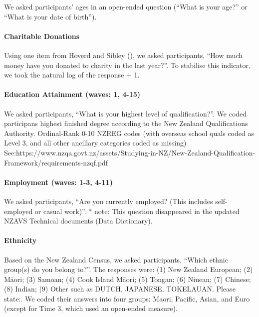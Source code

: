 \documentclass[
  singlecolumn]{article}
\let\oldparagraph\paragraph
\renewcommand{\paragraph}[1]{\oldparagraph{#1}\mbox{}}
\begin{document}
We asked participants' ages in an open-ended question (``What is your
age?'' or ``What is your date of birth'').

\paragraph{Charitable Donations}\label{charitable-donations}

Using one item from Hoverd and Sibley
(), we asked participants,
``How much money have you donated to charity in the last year?''. To
stabilise this indicator, we took the natural log of the response + 1.

\paragraph{Education Attainment (waves: 1,
4-15)}\label{education-attainment-waves-1-4-15}

We asked participants, ``What is your highest level of qualification?''.
We coded participans highest finished degree according to the New
Zealand Qualifications Authority. Ordinal-Rank 0-10 NZREG codes (with
overseas school quals coded as Level 3, and all other ancillary
categories coded as missing)
See:https://www.nzqa.govt.nz/assets/Studying-in-NZ/New-Zealand-Qualification-Framework/requirements-nzqf.pdf

\paragraph{Employment (waves: 1-3,
4-11)}\label{employment-waves-1-3-4-11}

We asked participants, ``Are you currently employed? (This includes
self-employed or casual work)''. * note: This question disappeared in
the updated NZAVS Technical documents (Data Dictionary).

\paragraph{Ethnicity}\label{ethnicity}

Based on the New Zealand Census, we asked participants, ``Which ethnic
group(s) do you belong to?''. The responses were: (1) New Zealand
European; (2) Māori; (3) Samoan; (4) Cook Island Māori; (5) Tongan; (6)
Niuean; (7) Chinese; (8) Indian; (9) Other such as DUTCH, JAPANESE,
TOKELAUAN. Please state:. We coded their answers into four groups:
Maori, Pacific, Asian, and Euro (except for Time 3, which used an
open-ended measure).
\end{document}
